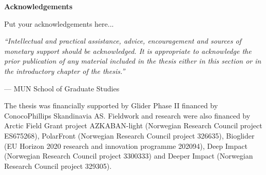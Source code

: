 \begin{center}
\textbf{\large Acknowledgements}
\end{center}

Put your acknowledgements here...

\vspace{1cm}

\emph{``Intellectual and practical assistance, advice, encouragement and
sources of monetary support should be acknowledged. It is appropriate to
acknowledge the prior publication of any material included in the thesis
either in this section or in the introductory chapter of the thesis.''}

\hfill --- MUN School of Graduate Studies

The thesis was financially supported by Glider Phase II financed by ConocoPhillips Skandinavia AS. Fieldwork and research were also financed by Arctic Field Grant project AZKABAN-light (Norwegian Research Council project ES675268), PolarFront (Norwegian Research Council project 326635), Bioglider (EU Horizon 2020 research and innovation programme 202094), Deep Impact (Norwegian Research Council project 3300333) and Deeper Impact (Norwegian Research Council project 329305). 